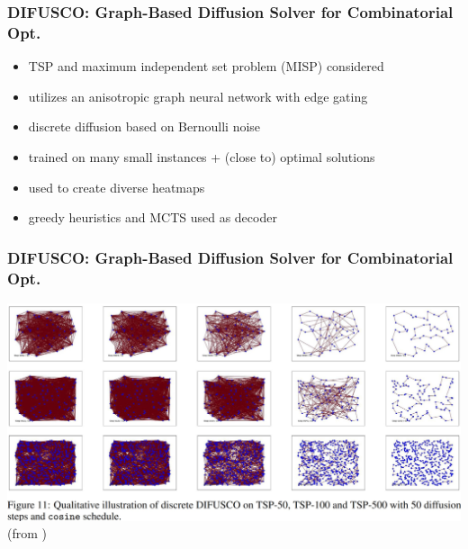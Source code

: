 \documentclass[aspectratio=1610]{beamer}
\newcommand{\important}[1]{{\color{green!60!black}#1}}
\begin{document}
\begin{frame}
	\frametitle{DIFUSCO: Graph-Based Diffusion Solver for Combinatorial Opt.} 
	
	\citep{sun-23}

	\bigskip
	\begin{itemize}
		\itemsep1ex
		\item TSP and maximum independent set problem (MISP) considered
		\item utilizes an anisotropic \important{graph neural network} with edge gating
		\item \important{discrete diffusion} based on Bernoulli noise
		\item trained on many small instances + (close to) optimal solutions
		\item used to create \important{diverse heatmaps} 
		\item greedy heuristics and MCTS used as decoder
	\end{itemize}

	\bigskip
\end{frame}

\begin{frame}
	\frametitle{DIFUSCO: Graph-Based Diffusion Solver for Combinatorial Opt.}

	\begin{center}
		\includegraphics[width=\textwidth]{graphics/difusco1.jpg}
		(from \citet{sun-23})
	\end{center}
\end{frame}
\end{document}
